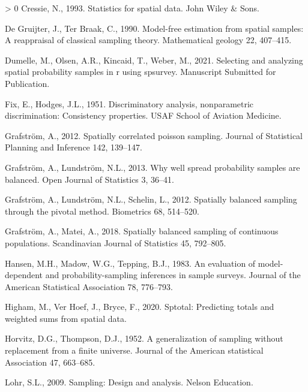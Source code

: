 \documentclass[]{elsarticle} %
\newlength{\cslhangindent}
\newenvironment{CSLReferences}[3] %
 {%
  \setlength{\parindent}{0pt}
  \ifodd #1 \everypar{\setlength{\hangindent}{\cslhangindent}}\ignorespaces\fi
  \ifnum #2 > 0
  \setlength{\parskip}{#2\baselineskip}
  \fi
 }%
 {}
\begin{document}
\begin{CSLReferences}{1}{0}
\leavevmode\hypertarget{ref-cressie1993statistics}{}%
Cressie, N., 1993. Statistics for spatial data. John Wiley \& Sons.

\leavevmode\hypertarget{ref-de1990model}{}%
De Gruijter, J., Ter Braak, C., 1990. Model-free estimation from spatial
samples: A reappraisal of classical sampling theory. Mathematical
geology 22, 407--415.

\leavevmode\hypertarget{ref-dumelle2021spsurvey}{}%
Dumelle, M., Olsen, A.R., Kincaid, T., Weber, M., 2021. Selecting and
analyzing spatial probability samples in r using spsurvey. Manuscript
Submitted for Publication.

\leavevmode\hypertarget{ref-fix1951discriminatory}{}%
Fix, E., Hodges, J.L., 1951. Discriminatory analysis, nonparametric
discrimination: Consistency properties. USAF School of Aviation
Medicine.

\leavevmode\hypertarget{ref-grafstrom2012spatiallypoisson}{}%
Grafström, A., 2012. Spatially correlated poisson sampling. Journal of
Statistical Planning and Inference 142, 139--147.

\leavevmode\hypertarget{ref-grafstrom2013well}{}%
Grafström, A., Lundström, N.L., 2013. Why well spread probability
samples are balanced. Open Journal of Statistics 3, 36--41.

\leavevmode\hypertarget{ref-grafstrom2012spatially}{}%
Grafström, A., Lundström, N.L., Schelin, L., 2012. Spatially balanced
sampling through the pivotal method. Biometrics 68, 514--520.

\leavevmode\hypertarget{ref-grafstrom2018spatially}{}%
Grafström, A., Matei, A., 2018. Spatially balanced sampling of
continuous populations. Scandinavian Journal of Statistics 45, 792--805.

\leavevmode\hypertarget{ref-hansen1983evaluation}{}%
Hansen, M.H., Madow, W.G., Tepping, B.J., 1983. An evaluation of
model-dependent and probability-sampling inferences in sample surveys.
Journal of the American Statistical Association 78, 776--793.

\leavevmode\hypertarget{ref-higham2020sptotal}{}%
Higham, M., Ver Hoef, J., Bryce, F., 2020. Sptotal: Predicting totals
and weighted sums from spatial data.

\leavevmode\hypertarget{ref-horvitz1952generalization}{}%
Horvitz, D.G., Thompson, D.J., 1952. A generalization of sampling
without replacement from a finite universe. Journal of the American
statistical Association 47, 663--685.

\leavevmode\hypertarget{ref-lohr2009sampling}{}%
Lohr, S.L., 2009. Sampling: Design and analysis. Nelson Education.


\end{CSLReferences}
\end{document}

